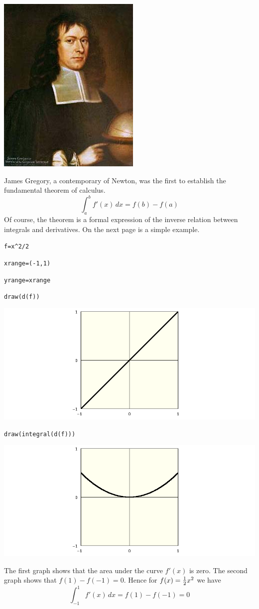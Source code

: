 \begin{center}
\includegraphics[]{JamesGregory.jpeg}
\end{center}

\bigskip

\noindent
James Gregory, a contemporary of Newton, was the first to establish the fundamental theorem of calculus.
$$\int_a^b f'(x)\,dx=f(b)-f(a)$$
Of course, the theorem is a formal expression of the inverse relation between integrals and derivatives.
On the next page is a simple example.

\newpage

\verb$f=x^2/2$

\verb$xrange=(-1,1)$

\verb$yrange=xrange$

\verb$draw(d(f))$

\noindent
\includegraphics[scale=0.5]{funda1.png}

\verb$draw(integral(d(f)))$

\medskip
\noindent
\includegraphics[scale=0.5]{funda2.png}

\medskip
\noindent
The first graph shows that the area under the curve $f'(x)$ is zero.
The second graph shows that $f(1)-f(-1)=0$.
Hence for $f(x)={1\over2}x^2$ we have
$$\int_{-1}^1f'(x)\,dx=f(1)-f(-1)=0$$


